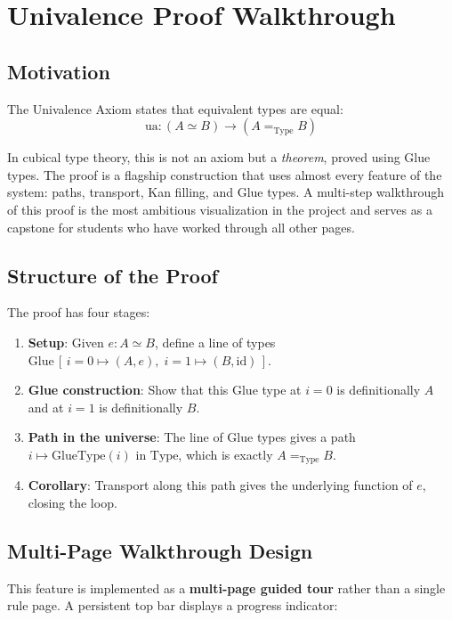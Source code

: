\documentclass[11pt,a4paper]{article}
\begin{document}
\section{Univalence Proof Walkthrough}

\subsection{Motivation}

The Univalence Axiom states that equivalent types are equal:
\[
  \mathrm{ua} : (A \simeq B) \to (A =_{\mathrm{Type}} B)
\]

In cubical type theory, this is not an axiom but a \emph{theorem}, proved using
Glue types. The proof is a flagship construction that uses almost every feature
of the system: paths, transport, Kan filling, and Glue types. A multi-step
walkthrough of this proof is the most ambitious visualization in the project
and serves as a capstone for students who have worked through all other pages.

\subsection{Structure of the Proof}

The proof has four stages:

\begin{enumerate}
  \item \textbf{Setup}: Given $e : A \simeq B$, define a line of types
    $\mathrm{Glue}\,[\,i=0 \mapsto (A,e),\;i=1 \mapsto (B,\mathrm{id})\,]$.
  \item \textbf{Glue construction}: Show that this Glue type at $i=0$ is
    definitionally $A$ and at $i=1$ is definitionally $B$.
  \item \textbf{Path in the universe}: The line of Glue types gives a path
    $i \mapsto \mathrm{GlueType}(i)$ in $\mathrm{Type}$, which is exactly
    $A =_{\mathrm{Type}} B$.
  \item \textbf{Corollary}: Transport along this path gives the underlying
    function of $e$, closing the loop.
\end{enumerate}

\subsection{Multi-Page Walkthrough Design}

This feature is implemented as a \textbf{multi-page guided tour} rather than
a single rule page. A persistent top bar displays a progress indicator:
\end{document}
